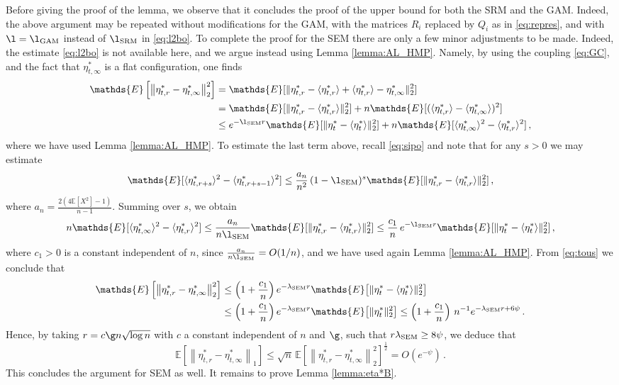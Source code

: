 \documentclass[11pt,reqno]{amsart}
\theoremstyle{remark}
\theoremstyle{definition}
\numberwithin{equation}{section}
\numberwithin{figure}{section}
\newcommand{\E}{\mathds{E}}
\newcommand{\tonde}[1]{\left(#1\right)}
\begin{document}
Before giving the proof of the lemma, we observe that it concludes the proof of the upper bound for both  the SRM and the GAM. Indeed,  the above argument may be repeated without modifications for the GAM, with the matrices $R_i$ replaced by $Q_i$ as in \eqref{eq:repres}, and with $\l=\l_{\rm GAM}$  instead of $\l_{\rm SRM}$ in \eqref{eq:l2bo}. To complete the proof for the SEM there are only a few minor adjustments to be made. Indeed, the estimate \eqref{eq:l2bo} is not available here, and we argue instead using Lemma \ref{lemma:AL_HMP}. 
	Namely, by using the coupling \eqref{eq:GC}, and the fact that $\eta_{t,\infty}^*$ is a flat configuration, one finds
	\begin{align}
	\E\left[\left\|\eta_{t,r}^*-\eta_{t,\infty}^*\right\|_2^2\right]	
		& = \E[\|\eta_{t,r}^*-\langle \eta_{t,r}^*\rangle+\langle \eta_{t,r}^*\rangle-\eta_{t,\infty}^*\|_2^2] \\
		&= \E[\|\eta_{t,r}^*-\langle \eta_{t,r}^*\rangle\|_2^2] + n\E[(\langle \eta_{t,r}^*\rangle-\langle \eta_{t,\infty}^*\rangle)^2]\\
		&\le e^{-\l_{\rm SEM}r}\E[\|\eta_t^*-\langle \eta_t^*\rangle\|_2^2]  + n\E[\langle \eta_{t,\infty}^*\rangle^2-\langle \eta_{t,r}^*\rangle^2]\,,
	\end{align}
	where we have used Lemma \ref{lemma:AL_HMP}. To estimate the last term above, recall \eqref{eq:sipo} and note that
	for any $s>0$ we may estimate
	\[
	\E[\langle \eta_{t,r+s}^*\rangle^2-\langle \eta_{t,r+s-1}^*\rangle^2]\le \frac{a_n}{n^2}\,(1-\l_{\rm SEM})^{s}\E[\|\eta_{t,r}^*-\langle \eta_{t,r}^*\rangle\|_2^2]\,,
	\]
	where $a_n=\frac{2(4\E[X^2]-1)}{n-1}$.
	Summing over $s$, we obtain
	\[n\E[\langle \eta_{t,\infty}^*\rangle^2-\langle \eta_{t,r}^*\rangle^2]\le \frac{a_n}{n\l_{\rm SEM}}\E[\|\eta_{t,r}^*-\langle \eta_{t,r}^*\rangle\|_2^2]\le  \frac{c_1}n\,e^{-\l_{\rm SEM}r}\E[\|\eta_t^*-\langle \eta_t^*\rangle\|_2^2]\,,
	\]
	where $c_1>0$ is a constant independent of $n$, since $\frac{a_n}{n\l_{\rm SEM}}=O(1/n)$, and we have used again Lemma \ref{lemma:AL_HMP}. From \eqref{eq:tous} we conclude that
	\begin{equation}
		\begin{split}
	\E\left[\left\|\eta_{t,r}^*-\eta_{t,\infty}^*\right\|_2^2\right]	
	&\le \tonde{1+\frac{c_1}{n}}e^{-\lambda_{\rm SEM}r}\E\big[\|\eta_t^*-\langle \eta_t^*\rangle\|_2^2\big]\\
		&\le  \tonde{1+\frac{c_1}{n}}e^{-\lambda_{\rm SEM}r}\E\big[\|\eta_t^*\|_2^2\big]\le  \tonde{1+\frac{c_1}{n}}\,n^{-1}e^{-\lambda_{\rm SEM}r+6\psi}
		\,.
		\end{split}
	\end{equation}
	Hence, by taking  $r=c\g n\sqrt {\log n}$ with $c$ a constant independent of $n$ and $\g$, such that $r\lambda_{\rm SEM}\ge 8\psi$, we deduce that 
\begin{equation}\label{eq:l2bo2}
		\E\left[\left\|\eta_{t,r}^*-\eta_{t,\infty}^*\right\|_1\right]
		\le 
		\sqrt n \,\E\left[\left\|\eta_{t,r}^*-\eta_{t,\infty}^*\right\|_2^2\right]^{\frac12}
		=O(e^{-\psi})\,.
	\end{equation}
	This concludes the argument for SEM as well. It remains to prove Lemma \ref{lemma:eta*B}.
	
\end{document}
